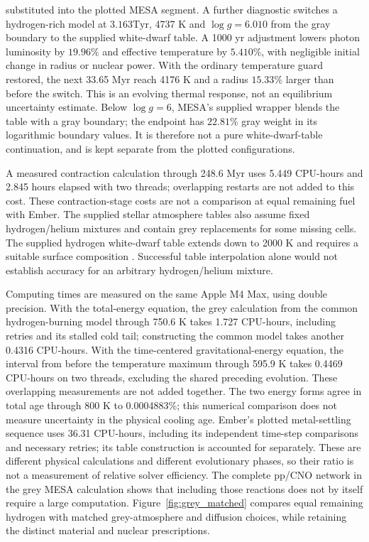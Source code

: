 \documentclass[11pt,letterpaper]{article}
\newcommand{\Tyr}{\mathrm{Tyr}}
\begin{document}
substituted into the plotted MESA segment.
A further diagnostic switches a hydrogen-rich model at
$3.163\Tyr$, 4737 K and $\log g=6.010$ from the gray boundary to the
supplied white-dwarf table. A 1000 yr adjustment lowers photon luminosity
by $19.96\%$ and effective temperature by $5.410\%$, with negligible
initial change in radius or nuclear power. With the ordinary temperature
guard restored, the next 33.65 Myr reach 4176 K and a radius $15.33\%$
larger than before the switch. This is an evolving thermal response,
not an equilibrium uncertainty estimate. Below $\log g=6$, MESA's supplied
wrapper blends the table with a gray boundary; the endpoint has $22.81\%$
gray weight in its logarithmic boundary values. It is therefore not a
pure white-dwarf-table continuation, and is kept separate from the plotted
configurations.

A measured contraction calculation through 248.6 Myr uses 5.449 CPU-hours
and 2.845 hours elapsed with two threads; overlapping restarts are not
added to this cost. These contraction-stage costs are not a comparison
at equal remaining fuel with Ember. The supplied stellar
atmosphere tables also assume fixed hydrogen/helium mixtures and contain
grey replacements for some missing cells. The supplied hydrogen white-dwarf
table extends down to 2000 K and requires a suitable surface composition
\cite{mesa_atm}. Successful table interpolation alone would not establish
accuracy for an arbitrary hydrogen/helium mixture.

Computing times are measured on the same Apple M4 Max, using double
precision. With the total-energy equation, the grey calculation from the
common hydrogen-burning model through 750.6 K takes 1.727 CPU-hours,
including retries and its stalled cold tail; constructing the common model
takes another 0.4316 CPU-hours. With the time-centered gravitational-energy
equation, the interval from before the temperature maximum through 595.9 K
takes 0.4469 CPU-hours on two threads, excluding the shared preceding
evolution. These overlapping measurements are not added together.
The two energy forms agree in total age through 800 K to 0.0004883\%;
this numerical comparison does not measure uncertainty in the physical
cooling age. Ember's plotted
metal-settling sequence uses 36.31 CPU-hours, including its independent
time-step comparisons and necessary retries; its table construction is
accounted for separately. These are different physical calculations and
different evolutionary phases, so their ratio is not a measurement of
relative solver efficiency. The complete pp/CNO network in the grey MESA
calculation shows that including those reactions does not by itself
require a large computation. Figure~\ref{fig:grey_matched} compares equal
remaining hydrogen with matched grey-atmosphere and diffusion choices,
while retaining the distinct material and nuclear prescriptions.
\end{document}
